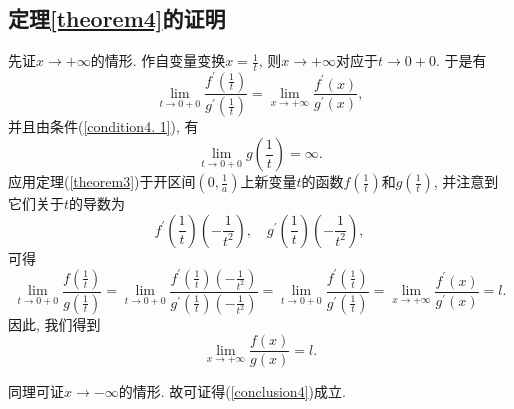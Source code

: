 \documentclass{ctexart}
\begin{document}
\subsection{定理\ref{theorem4}的证明}
先证$x\rightarrow +\infty$的情形. 作自变量变换$x=\frac{1}{t}$, 则$x\rightarrow +\infty$对应于$t\rightarrow 0+0$. 于是有
\begin{equation}\label{eq4. 1}
    \lim_{t\rightarrow 0+0}\frac{f^{'}(\frac{1}{t})}{g^{'}(\frac{1}{t})}=\lim_{x\rightarrow +\infty}\frac{f^{'}(x)}{g^{'}(x)}, 
\end{equation}
并且由条件(\ref{condition4. 1}), 有
\begin{equation}\label{eq4. 2}
    \lim_{t\rightarrow 0+0}g(\frac{1}{t})=\infty.
\end{equation}
应用定理(\ref{theorem3})于开区间$(0, \frac{1}{a})$上新变量$t$的函数$f(\frac{1}{t})$和$g(\frac{1}{t})$, 并注意到它们关于$t$的导数为
\begin{equation}\label{eq4. 3}
    f^{'}(\frac{1}{t})(-\frac{1}{t^2}), \quad g^{'}(\frac{1}{t})(-\frac{1}{t^2}), 
\end{equation}
可得
\begin{equation}\label{eq4. 4}
    \lim_{t\rightarrow 0+0}\frac{f(\frac{1}{t})}{g(\frac{1}{t})}=\lim_{t\rightarrow 0+0}\frac{f^{'}(\frac{1}{t})(-\frac{1}{t^2})}{g^{'}(\frac{1}{t})(-\frac{1}{t^2})}=\lim_{t\rightarrow 0+0}\frac{f^{'}(\frac{1}{t})}{g^{'}(\frac{1}{t})}=\lim_{x\rightarrow +\infty}\frac{f^{'}(x)}{g^{'}(x)}=l.
\end{equation}
因此, 我们得到
\begin{equation}\label{eq4. 5}
    \lim_{x\rightarrow +\infty}\frac{f(x)}{g(x)}=l.
\end{equation}
\par 同理可证$x\rightarrow -\infty$的情形. 故可证得(\ref{conclusion4})成立.
\end{document}
